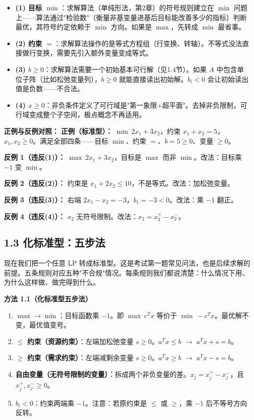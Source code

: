 \begin{itemize}
  \item \textbf{(1) 目标 $\min$}：求解算法（单纯形法，第2章）的符号规则建立在 $\min$ 问题上——算法通过"检验数"（衡量非基变量进基后目标能改善多少的指标）判断最优，其符号约定依赖于 $\min$ 方向。如果是 $\max$，先转成 $\min$ 最省事。

  \item \textbf{(2) 约束 $=$}：求解算法操作的是等式方程组（行变换、转轴）。不等式没法直接做行变换，需要先引入额外变量变成等式。

  \item \textbf{(3) $b\ge 0$}：求解算法需要一个初始基本可行解（见1.4节）。如果 $A$ 中包含单位子阵（比如松弛变量列），$b\ge 0$ 就能直接读出初始解。$b_i<0$ 会让初始读出值是负数——不合法。

  \item \textbf{(4) $x\ge 0$}：非负条件定义了可行域是"第一象限+超平面"。去掉非负限制，可行域变成整个子空间，极点概念不再适用。
\end{itemize}

\textbf{正例与反例对照：}
\medskip
\noindent
\textbf{正例（标准型）：} $\min\ 2x_1+3x_2$，约束 $x_1+x_2=5$，$x_1,x_2\ge 0$。满足全部四条——目标 $\min$、约束 $=$、$b=5\ge 0$、变量 $\ge 0$。

\noindent
\textbf{反例 1（违反(1)）：} $\max\ 2x_1+3x_2$，目标是 $\max$ 而非 $\min$。改法：目标乘 $-1$ 变 $\min$。

\noindent
\textbf{反例 2（违反(2)）：} 约束是 $x_1+2x_2\le 10$，不是等式。改法：加松弛变量。

\noindent
\textbf{反例 3（违反(3)）：} 右端 $2x_1-x_2=-3$，$b_1=-3<0$。改法：乘 $-1$ 翻正。

\noindent
\textbf{反例 4（违反(4)）：} $x_2$ 无符号限制。改法：$x_2=x_2^+-x_2^-$。

\subsection{1.3 化标准型：五步法}

现在我们把一个任意 LP 转成标准型。这是考试第一题常见问法，也是后续求解的前提。五条规则对应五种"不合规"情况。每条规则我们都说清楚：什么情况下用、为什么这样做、做完得到什么。

\textbf{方法 1.1（化标准型五步法）}

\begin{enumerate}
  \item \textbf{$\max \to \min$}：目标函数乘 $-1$。即 $\max\ c^T x$ 等价于 $\min\ -c^T x$。最优解不变，最优值变号。
  \item \textbf{$\le$ 约束（资源约束）}：左端加松弛变量 $s \ge 0$。$a^T x \le b$ $\to$ $a^T x + s = b$。
  \item \textbf{$\ge$ 约束（需求约束）}：左端减剩余变量 $s \ge 0$。$a^T x \ge b$ $\to$ $a^T x - s = b$。
  \item \textbf{自由变量（无符号限制的变量）}：拆成两个非负变量的差。$x_j = x_j^+ - x_j^-$，且 $x_j^+, x_j^- \ge 0$。
  \item \textbf{$b_i < 0$}：约束两端乘 $-1$。注意：若原约束是 $\le$ 或 $\ge$，乘 $-1$ 后不等号方向反转。
\end{enumerate}

